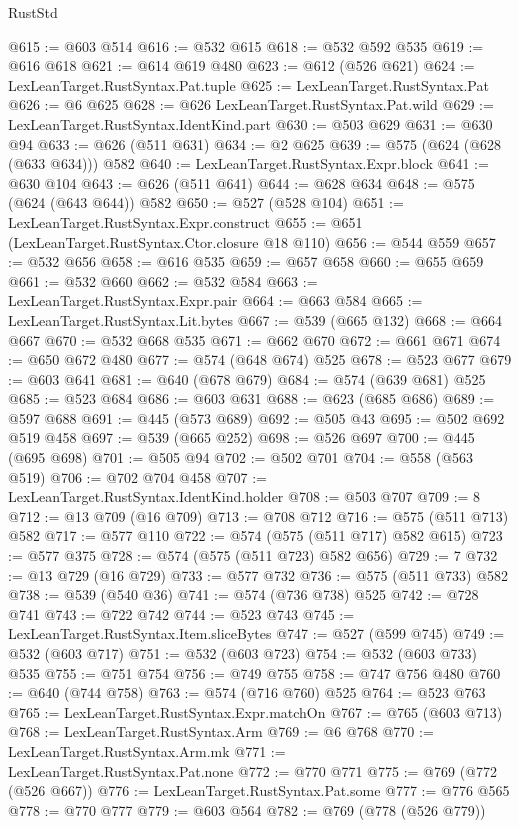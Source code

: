 \begin{lexlean}{RustStd}
\begin{coremodule}
@615 := @603 @514
@616 := @532 @615
@618 := @532 @592 @535
@619 := @616 @618
@621 := @614 @619 @480
@623 := @612 (@526 @621)
@624 := LexLeanTarget.RustSyntax.Pat.tuple
@625 := LexLeanTarget.RustSyntax.Pat
@626 := @6 @625
@628 := @626 LexLeanTarget.RustSyntax.Pat.wild
@629 := LexLeanTarget.RustSyntax.IdentKind.part
@630 := @503 @629
@631 := @630 @94
@633 := @626 (@511 @631)
@634 := @2 @625
@639 := @575 (@624 (@628 (@633 @634))) @582
@640 := LexLeanTarget.RustSyntax.Expr.block
@641 := @630 @104
@643 := @626 (@511 @641)
@644 := @628 @634
@648 := @575 (@624 (@643 @644)) @582
@650 := @527 (@528 @104)
@651 := LexLeanTarget.RustSyntax.Expr.construct
@655 := @651 (LexLeanTarget.RustSyntax.Ctor.closure @18 @110)
@656 := @544 @559
@657 := @532 @656
@658 := @616 @535
@659 := @657 @658
@660 := @655 @659
@661 := @532 @660
@662 := @532 @584
@663 := LexLeanTarget.RustSyntax.Expr.pair
@664 := @663 @584
@665 := LexLeanTarget.RustSyntax.Lit.bytes
@667 := @539 (@665 @132)
@668 := @664 @667
@670 := @532 @668 @535
@671 := @662 @670
@672 := @661 @671
@674 := @650 @672 @480
@677 := @574 (@648 @674) @525
@678 := @523 @677
@679 := @603 @641
@681 := @640 (@678 @679)
@684 := @574 (@639 @681) @525
@685 := @523 @684
@686 := @603 @631
@688 := @623 (@685 @686)
@689 := @597 @688
@691 := @445 (@573 @689)
@692 := @505 @43
@695 := @502 @692 @519 @458
@697 := @539 (@665 @252)
@698 := @526 @697
@700 := @445 (@695 @698)
@701 := @505 @94
@702 := @502 @701
@704 := @558 (@563 @519)
@706 := @702 @704 @458
@707 := LexLeanTarget.RustSyntax.IdentKind.holder
@708 := @503 @707
@709 := 8
@712 := @13 @709 (@16 @709)
@713 := @708 @712
@716 := @575 (@511 @713) @582
@717 := @577 @110
@722 := @574 (@575 (@511 @717) @582 @615)
@723 := @577 @375
@728 := @574 (@575 (@511 @723) @582 @656)
@729 := 7
@732 := @13 @729 (@16 @729)
@733 := @577 @732
@736 := @575 (@511 @733) @582
@738 := @539 (@540 @36)
@741 := @574 (@736 @738) @525
@742 := @728 @741
@743 := @722 @742
@744 := @523 @743
@745 := LexLeanTarget.RustSyntax.Item.sliceBytes
@747 := @527 (@599 @745)
@749 := @532 (@603 @717)
@751 := @532 (@603 @723)
@754 := @532 (@603 @733) @535
@755 := @751 @754
@756 := @749 @755
@758 := @747 @756 @480
@760 := @640 (@744 @758)
@763 := @574 (@716 @760) @525
@764 := @523 @763
@765 := LexLeanTarget.RustSyntax.Expr.matchOn
@767 := @765 (@603 @713)
@768 := LexLeanTarget.RustSyntax.Arm
@769 := @6 @768
@770 := LexLeanTarget.RustSyntax.Arm.mk
@771 := LexLeanTarget.RustSyntax.Pat.none
@772 := @770 @771
@775 := @769 (@772 (@526 @667))
@776 := LexLeanTarget.RustSyntax.Pat.some
@777 := @776 @565
@778 := @770 @777
@779 := @603 @564
@782 := @769 (@778 (@526 @779))

\end{coremodule}
\end{lexlean}
